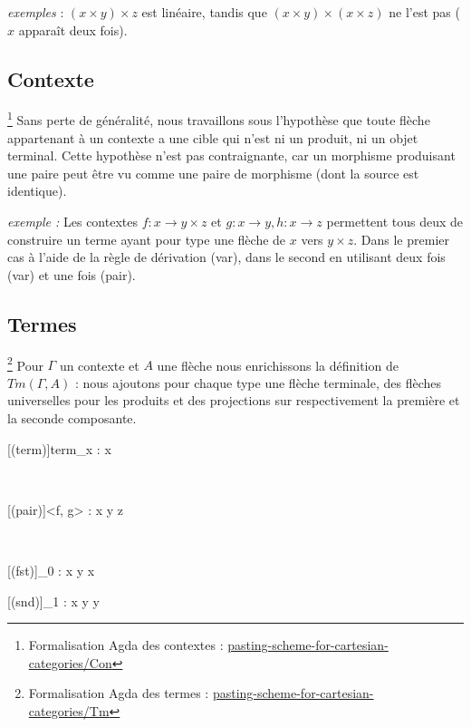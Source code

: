 \documentclass[conference]{IEEEtran}
\begin{document}
	\textit{exemples} : $(x \times y) \times z$ est linéaire, tandis que $(x \times y) \times (x \times z)$ ne l'est pas ($x$ apparaît deux fois).
	
	\subsection{Contexte}
	\footnote{Formalisation Agda des contextes : \href{https://github.com/ehouget/L3-ENS-Internship/tree/main/pasting-scheme-for-cartesian-categories/Con}{pasting-scheme-for-cartesian-categories/Con}}
	Sans perte de généralité, nous travaillons sous l'hypothèse que toute flèche appartenant à un contexte a une cible qui n'est ni un produit, ni un objet terminal. Cette hypothèse n'est pas contraignante, car un morphisme produisant une paire peut être vu comme une paire de morphisme (dont la source est identique).
	
	\textit{exemple :} Les contextes $f : x \rightarrow y \times z$ et $g : x \rightarrow y, h : x \rightarrow z$ permettent tous deux de construire un terme ayant pour type une flèche de $x$ vers $y \times z$. Dans le premier cas à l'aide de la règle de dérivation (var), dans le second en utilisant deux fois (var) et une fois (pair).
	
	\subsection{Termes}
	\footnote{Formalisation Agda des termes : \href{https://github.com/ehouget/L3-ENS-Internship/tree/main/pasting-scheme-for-cartesian-categories/Tm}{pasting-scheme-for-cartesian-categories/Tm}}
	Pour $\Gamma$ un contexte et $A$ une flèche nous enrichissons la définition de $Tm(\Gamma, A)$ : nous ajoutons pour chaque type une flèche terminale, des flèches universelles pour les produits et des projections sur respectivement la première et la seconde composante.
	\begin{center}
		\begin{prooftree}
			[(term)]{\Gamma \vdash term_x : x \rightarrow {}}
		\end{prooftree} \\
		\vspace{20pt}
		\begin{prooftree}
			\hypo[]{\Gamma \vdash f : x \rightarrow y}
			\hypo[]{\Gamma \vdash g : x \rightarrow z}
			[(pair)]{\Gamma \vdash \left<f, g\right> : x \rightarrow y \times z}
		\end{prooftree} \\
		\vspace{20pt}
		\begin{prooftree}
			[(fst)]{\Gamma \vdash \pi_0 : x \times y \rightarrow x}
		\end{prooftree}
		\hspace{20pt}
		\begin{prooftree}
			[(snd)]{\Gamma \vdash \pi_1 : x \times y \rightarrow y}
		\end{prooftree}
	\end{center}
	
\end{document}
